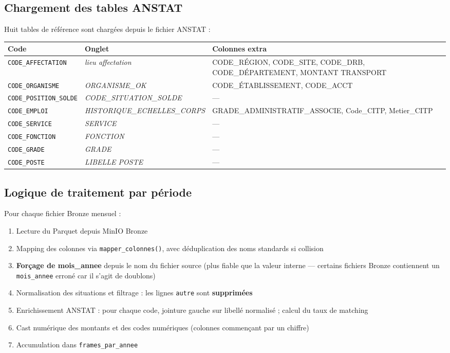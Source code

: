 \documentclass[12pt,a4paper,french]{report}
\begin{document}
\subsection{Chargement des tables ANSTAT}

Huit tables de référence sont chargées depuis le fichier ANSTAT :

\begin{tabularx}{\textwidth}{llX}
  \toprule
  \textbf{Code} & \textbf{Onglet} & \textbf{Colonnes extra} \\
  \midrule
  \texttt{CODE\_AFFECTATION} & \textit{lieu affectation} &
    CODE\_RÉGION, CODE\_SITE, CODE\_DRB, CODE\_DÉPARTEMENT,
    MONTANT TRANSPORT \\
  \texttt{CODE\_ORGANISME} & \textit{ORGANISME\_OK} &
    CODE\_ÉTABLISSEMENT, CODE\_ACCT \\
  \texttt{CODE\_POSITION\_SOLDE} & \textit{CODE\_SITUATION\_SOLDE} & --- \\
  \texttt{CODE\_EMPLOI} & \textit{HISTORIQUE\_ECHELLES\_CORPS} &
    GRADE\_ADMINISTRATIF\_ASSOCIE, Code\_CITP, Metier\_CITP \\
  \texttt{CODE\_SERVICE} & \textit{SERVICE} & --- \\
  \texttt{CODE\_FONCTION} & \textit{FONCTION} & --- \\
  \texttt{CODE\_GRADE} & \textit{GRADE} & --- \\
  \texttt{CODE\_POSTE} & \textit{LIBELLE POSTE} & --- \\
  \bottomrule
\end{tabularx}

\subsection{Logique de traitement par période}

Pour chaque fichier Bronze mensuel :

\begin{enumerate}
  \item Lecture du Parquet depuis MinIO Bronze
  \item Mapping des colonnes via \texttt{mapper\_colonnes()},
        avec déduplication des noms standards si collision
  \item \textbf{Forçage de mois\_annee} depuis le nom du fichier source
        (plus fiable que la valeur interne --- certains fichiers Bronze
        contiennent un \texttt{mois\_annee} erroné car il s'agit de doublons)
  \item Normalisation des situations et filtrage : les lignes
        \texttt{autre} sont \textbf{supprimées}
  \item Enrichissement ANSTAT : pour chaque code, jointure gauche sur
        libellé normalisé ; calcul du taux de matching
  \item Cast numérique des montants et des codes numériques (colonnes
        commençant par un chiffre)
  \item Accumulation dans \texttt{frames\_par\_annee}
\end{enumerate}
\end{document}
